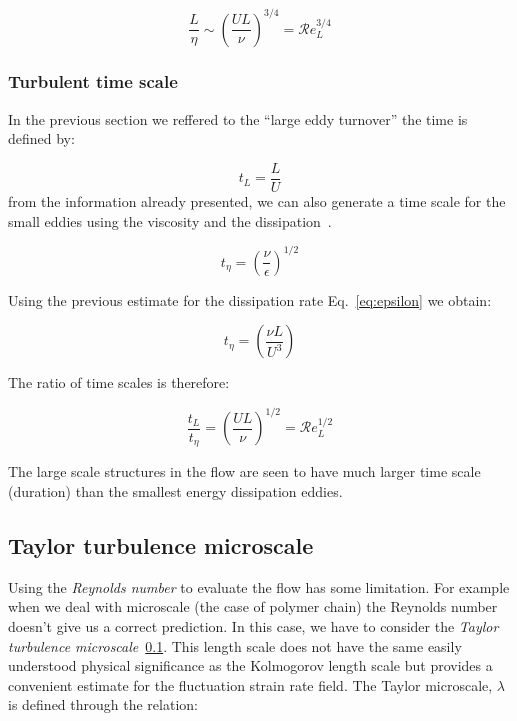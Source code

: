 \begin{equation}
\frac{L}{\eta} \sim  \left(\frac{UL}{\nu} \right)^{3/4} = \mathcal{R}e_L^{3/4}
\label{eq:ratiolength}
\end{equation}

\subsubsection{Turbulent time scale}

In the previous section we reffered to the ``large eddy turnover''  the time is defined by:

\begin{equation}
t_L = \frac{L}{U} 
\label{eq:timel}
\end{equation}
from the information already presented, we can also generate a time scale for the small eddies using the viscosity and the dissipation~\cite{pope}.

\begin{equation}
t_\eta = \left( \frac{\nu}{\epsilon} \right)^{1/2}
\label{eq:timeeta}
\end{equation} 

Using the previous estimate for the dissipation rate Eq.~\ref{eq:epsilon}  we obtain: 

\begin{equation}
t_\eta = \left( \frac{\nu L}{U^3} \right)
\label{eq:timeeta2}
\end{equation}

The ratio of time scales is therefore:

\begin{equation}
\frac{t_L}{t_\eta} = \left( \frac{UL}{\nu} \right)^{1/2} = \mathcal{R}e_L^{1/2}
\label{eq:timeratio}
\end{equation}

The large scale structures in the flow are seen to have much larger time scale (duration) than the smallest energy dissipation eddies.

\subsection{Taylor turbulence microscale}
\label{sec:taylor}
Using the \textit{Reynolds number} to evaluate the flow has some limitation. For example when we deal with microscale (the case of polymer chain) the Reynolds number doesn't give us a correct prediction. In this case, we have to consider the \textit{Taylor turbulence microscale}~\ref{sec:taylor}.
This length scale does not have the same easily understood physical significance as the Kolmogorov length scale but provides a convenient estimate for the fluctuation strain rate field. 
The Taylor microscale, $\lambda$ is defined through the relation:

